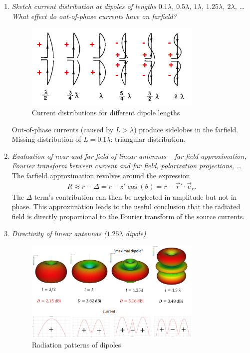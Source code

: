 \documentclass[11pt,a4paper]{article}
\begin{document}
\begin{enumerate}
    \item \emph{Sketch current distribution at dipoles of lengths $0.1\lambda$, $0.5\lambda$, $1\lambda$, $1.25\lambda$, $2\lambda$, \dots What effect do out-of-phase currents have on farfield?}
    \begin{figure}[!ht]
        \centering
        \includegraphics[width=0.8\textwidth]{src/dipole-lengths.png}
        \caption{\label{fig:dipole-lengths}Current distributions for different dipole lengths}
    \end{figure}
    Out-of-phase currents (caused by $L > \lambda$) produce sidelobes in the farfield.\\
    Missing distribution of $L = 0.1\lambda$: triangular distribution.

    \item \emph{Evaluation of near and far field of linear antennas -- far field approximation, Fourier transform between current and far field, polarization projections, \dots}\\
    The farfield approximation revolves around the expression
    \begin{align*}
        R \approx r-\Delta = r-z' \cos(\theta) = r-\vec r' \cdot \vec e_r.
    \end{align*}
    The $\Delta$ term's contribution can then be neglected in amplitude but not in phase. This approximation leads to the useful conclusion that the radiated field is directly proportional to the Fourier transform of the source currents.

    \item \emph{Directivity of linear antennas ($1.25\lambda$ dipole)}
    \begin{figure}[!ht]
        \centering
        \includegraphics[width=0.8\textwidth]{src/dipole-radiation-patterns.png}
        \caption{\label{fig:dipoles-radiation-patterns}Radiation patterns of dipoles}
    \end{figure}


\end{enumerate}
\end{document}
